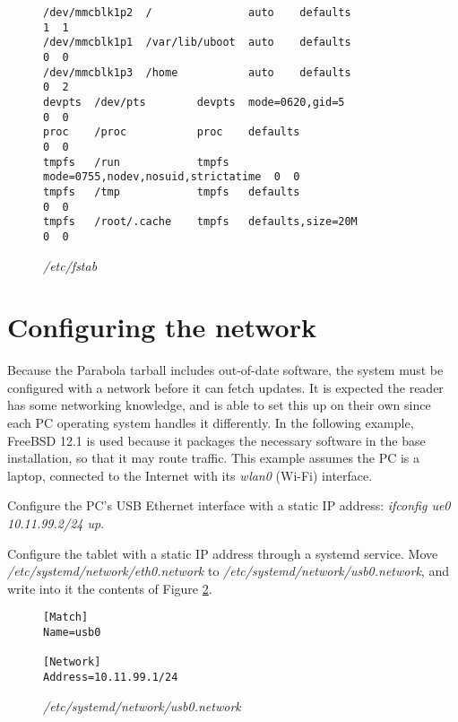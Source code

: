 \documentclass{memoir}
\begin{document}
\begin{figure}[h]
\begin{verbatim}
/dev/mmcblk1p2  /               auto    defaults                    1  1
/dev/mmcblk1p1  /var/lib/uboot  auto    defaults                    0  0
/dev/mmcblk1p3  /home           auto    defaults                    0  2
devpts  /dev/pts        devpts  mode=0620,gid=5                     0  0
proc    /proc           proc    defaults                            0  0
tmpfs   /run            tmpfs   mode=0755,nodev,nosuid,strictatime  0  0
tmpfs   /tmp            tmpfs   defaults                            0  0
tmpfs   /root/.cache    tmpfs   defaults,size=20M                   0  0
\end{verbatim}
\caption{\textit{/etc/fstab}}
\label{fig:fstab}
\end{figure}



\pagebreak
\section{Configuring the network}
Because the Parabola tarball includes out-of-date software, the system must be configured with a network before it can fetch updates. It is expected the reader has some networking knowledge, and is able to set this up on their own since each PC operating system handles it differently. In the following example, FreeBSD 12.1 is used because it packages the necessary software in the base installation, so that it may route traffic. This example assumes the PC is a laptop, connected to the Internet with its \textit{wlan0} (Wi-Fi) interface.

Configure the PC's USB Ethernet interface with a static IP address: \textit{ifconfig ue0 10.11.99.2/24 up}.

Configure the tablet with a static IP address through a systemd service. Move \textit{/etc/systemd/network/eth0.network} to \textit{/etc/systemd/network/usb0.network}, and write into it the contents of Figure \ref{fig:usb0net}.

\begin{figure}[h]
\begin{verbatim}
[Match]
Name=usb0

[Network]
Address=10.11.99.1/24
\end{verbatim}
\caption{\textit{/etc/systemd/network/usb0.network}}
\label{fig:usb0net}
\end{figure}
\end{document}
